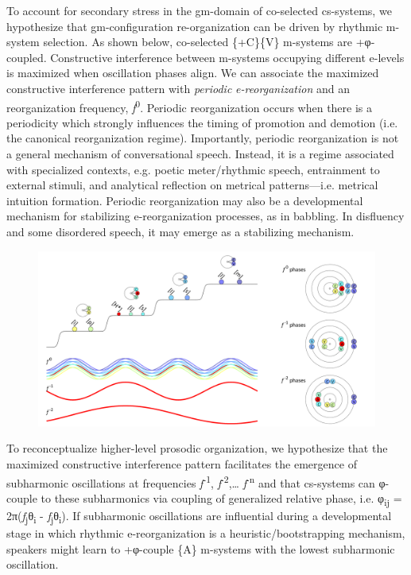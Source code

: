   To account for secondary stress in the gm-domain of co-selected cs-systems, we hypothesize that gm-configuration re-organization can be driven by rhythmic m-system selection. As shown below, co-selected \{+C\}\{V\} m-systems are +φ-coupled. Constructive interference between m-systems occupying different e-levels is maximized when oscillation phases align. We can associate the maximized constructive interference pattern with \textit{periodic} \textit{e-reorganization} and an reorganization frequency, \textit{f}\textsuperscript{0}. Periodic reorganization occurs when there is a periodicity which strongly influences the timing of promotion and demotion (i.e. the canonical reorganization regime). Importantly, periodic reorganization is not a general mechanism of conversational speech. Instead, it is a regime associated with specialized contexts, e.g. poetic meter/rhythmic speech, entrainment to external stimuli, and analytical reflection on metrical patterns—i.e. metrical intuition formation. Periodic reorganization may also be a developmental mechanism for stabilizing e-reorganization processes, as in babbling. In disfluency and some disordered speech, it may emerge as a stabilizing mechanism.

  
\begin{figure}
\includegraphics[width=\textwidth]{figures/Tilsen-img64.png}
\caption{\missingcaption}
\label{fig:}
\end{figure}
 

  To reconceptualize higher-level prosodic organization, we hypothesize that the maximized constructive interference pattern facilitates the emergence of subharmonic oscillations at frequencies \textit{f}\textsuperscript{{}-1}, \textit{f}\textsuperscript{{}-2},… \textit{f}\textsuperscript{{}-n} and that cs-systems can φ-couple to these subharmonics via coupling of generalized relative phase, i.e. φ\textsubscript{ij} = 2π(\textit{f}\textsubscript{j}θ\textsubscript{i} - \textit{f}\textsubscript{j}θ\textsubscript{i}). If subharmonic oscillations are influential during a developmental stage in which rhythmic e-reorganization is a heuristic/bootstrapping mechanism, speakers might learn to +φ-couple \{A\} m-systems with the lowest subharmonic oscillation.


